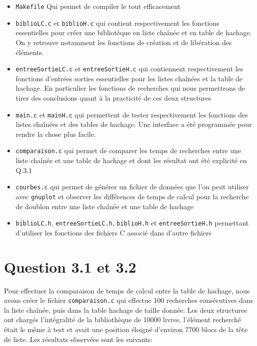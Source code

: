 \documentclass{article}
\begin{document}
    \begin{itemize}
        \item \texttt{Makefile} Qui permet de compiler le tout efficacement
        \item \texttt{biblioLC.c} et \texttt{biblioH.c} qui contient respectivement
        les fonctions essentielles pour créer une bibliotèque en liste chaînée et
        en table de hachage. On y retrouve notamment les fonctions de création et
        de libération des éléments.
        \item \texttt{entreeSortieLC.c} et \texttt{entreeSortieH.c} qui contiennent
        respectivement les fonctions d'entrées sorties essentielles pour les listes chaînées
        et la table de hachage. En particulier les fonctions de recherches qui nous
        permettrons de tirer des conclusions quant à la practicité de ces deux structures
        \item \texttt{main.c} et \texttt{mainH.c} qui permettent de tester respectivement
        les fonctions des listes chaînées et des tables de hachage. Une interface a été
        programmée pour rendre la chose plus facile.
        \item \texttt{comparaison.c} qui permet de comparer les temps de recherches entre
        une liste chaînée et une table de hachage et dont les résultat ont été explicité
        en Q.3.1
        \item \texttt{courbes.c} qui permet de générer un fichier de données 
        que l'on peut utiliser avec \texttt{gnuplot} et observer les différences
        de temps de calcul pour la recherche de doublon entre une liste chaînée et
        une table de hachage
        \item \texttt{biblioLC.h}, \texttt{entreeSortieLC.h}, \texttt{biblioH.h} et \texttt{entreeSortieH.h}
        permettant d'utiliser les fonctions des fichiers C associé dans d'autre fichiers
    \end{itemize}
    

    \newpage
    \section{Question 3.1 et 3.2}

    Pour effectuer la comparaison de temps de calcul entre la table de hachage, nous avons créer
    le fichier \texttt{comparaison.c} qui effectue 100 recherches consécutives 
    dans la liste chaînée, puis dans la table hachage de taille donnée. 
    \newline
    Les deux structures ont chargés l'intégralité de la bibliothèque de 10000 livres,
    l'élément recherché était le même à test et avait une position éloigné 
    d'environ 7700 blocs de la tête de liste.
    \newline
    Les résultats observées sont les suivants:
\end{document}
